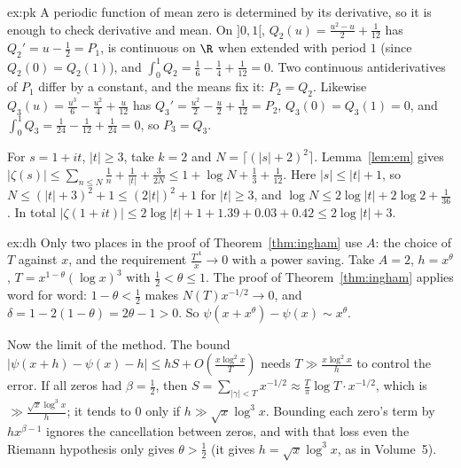 \begin{solution}{ex:pk}
\idea A periodic function of mean zero is determined by its derivative, so it is enough to check derivative and mean.
\writeup On $]0,1[$, $Q_2(u)=\frac{u^2-u}2+\frac1{12}$ has $Q_2'=u-\frac12=P_1$, is continuous on $\R$ when extended with period $1$ (since $Q_2(0)=Q_2(1)$), and $\int_0^1Q_2=\frac16-\frac14+\frac1{12}=0$. Two continuous antiderivatives of $P_1$ differ by a constant, and the means fix it: $P_2=Q_2$. Likewise
$Q_3(u)=\frac{u^3}6-\frac{u^2}4+\frac u{12}$ has $Q_3'=\frac{u^2}2-\frac u2+\frac1{12}=P_2$, $Q_3(0)=Q_3(1)=0$, and $\int_0^1Q_3=\frac1{24}-\frac1{12}+\frac1{24}=0$, so $P_3=Q_3$.

For $s=1+it$, $|t|\ge3$, take $k=2$ and $N=\lceil(|s|+2)^2\rceil$. Lemma~\ref{lem:em} gives $|\zeta(s)|\le\sum_{n\le N}\frac1n+\frac1{|t|}+\frac3{2N}\le1+\log N+\frac13+\frac1{12}$. Here $|s|\le|t|+1$, so $N\le(|t|+3)^2+1\le(2|t|)^2+1$ for $|t|\ge3$, and $\log N\le2\log|t|+2\log2+\frac1{36}$. In total $|\zeta(1+it)|\le2\log|t|+1+1.39+0.03+0.42\le2\log|t|+3$.
\end{solution}

\begin{solution}{ex:dh}
\idea Only two places in the proof of Theorem~\ref{thm:ingham} use $A$: the choice of $T$ against $x$, and the requirement $\frac{T^A}x\to0$ with a power saving.
\writeup Take $A=2$, $h=x^\theta$, $T=x^{1-\theta}(\log x)^3$ with $\frac12<\theta\le1$. The proof of Theorem~\ref{thm:ingham} applies word for word: $1-\theta<\frac12$ makes $N(T)x^{-1/2}\to0$, and $\delta=1-2(1-\theta)=2\theta-1>0$. So $\psi(x+x^\theta)-\psi(x)\sim x^\theta$.

Now the limit of the method. The bound $|\psi(x+h)-\psi(x)-h|\le hS+O(\frac{x\log^2x}T)$ needs $T\gg\frac{x\log^2x}h$ to control the error. If all zeros had $\beta=\frac12$, then $S=\sum_{|\gamma|<T}x^{-1/2}\approx\frac T\pi\log T\cdot x^{-1/2}$, which is $\gg\frac{\sqrt x\log^3 x}h$; it tends to $0$ only if $h\gg\sqrt x\log^3x$. Bounding each zero's term by $hx^{\beta-1}$ ignores the cancellation between zeros, and with that loss even the Riemann hypothesis only gives $\theta>\frac12$ (it gives $h=\sqrt x\log^3x$, as in Volume~5).
\end{solution}

